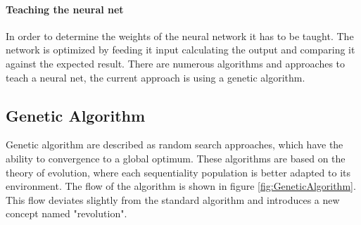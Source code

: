 \documentclass[11pt,fleqn,,a4paper,twoside,openright]{book}
\begin{document}
\paragraph{Teaching the neural net}
In order to determine the weights of the neural network it has to be taught. The network is optimized by feeding it input calculating the output and comparing it against the expected result. There are numerous algorithms and approaches to teach a neural net, the current approach is using a genetic algorithm. 

\subsection{Genetic Algorithm}
Genetic algorithm are described as random search approaches, which have the ability to convergence to a global optimum. These algorithms are based on the theory of evolution, where each sequentiality population is better adapted to its environment. The flow of the algorithm is shown in figure \ref{fig:GeneticAlgorithm}. This flow deviates slightly from the standard algorithm and introduces a new concept named "revolution".
\end{document}
